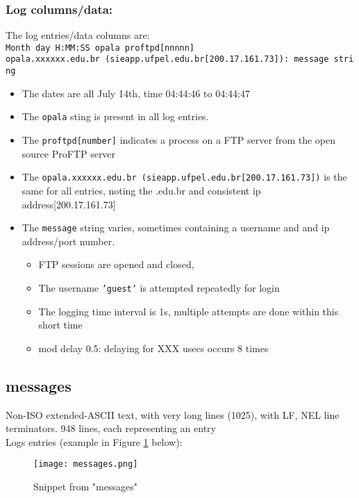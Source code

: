 \documentclass[
	letterpaper, %
	10pt, %
	unnumberedsections, %
	twoside, %
]{APAAssignment}
\begin{document}
\subsubsection{Log columns/data:} The log entries/data columns are: \\
\texttt{Month day H:MM:SS opala proftpd[nnnnn] opala.xxxxxx.edu.br\ (sieapp.ufpel.edu.br[200.17.161.73]):\ message\ string}
\begin{itemize}
	\item The dates are all July 14th, time 04:44:46 to 04:44:47
	\item The \texttt{opala} sting is present in all log entries.
	\item The \texttt{proftpd[number]} indicates a process on a FTP server from the open source ProFTP server
	\item The \texttt{opala.xxxxxx.edu.br\ (sieapp.ufpel.edu.br[200.17.161.73])} is the same for all entries, noting the .edu.br and consistent ip address{[}200.17.161.73{]}
	\item The \texttt{message} string varies, sometimes containing a username and and ip address/port number.
	      \begin{itemize}
		      \item FTP sessions are opened and closed,
		      \item The username \texttt{'guest'} is attempted repeatedly for login
		      \item The logging time interval is 1s, multiple attempts are done within this short time
		      \item mod delay 0.5: delaying for XXX usecs occurs 8 times
	      \end{itemize}
\end{itemize}


\subsection{messages}\label{messages}
Non-ISO extended-ASCII text, with very long lines (1025), with LF, NEL line terminators. 948 lines, each representing an entry \\
Logs entries (example in Figure \ref{fig:messages} below): \\
\begin{figure}[!htp] %
	\centering
	\texttt{[image: messages.png]}
	\caption{Snippet from "messages"}	\label{fig:messages}
\end{figure}
\end{document}
